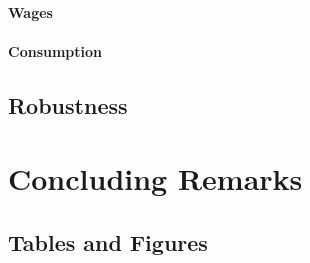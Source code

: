 \documentclass[10pt]{article}
\theoremstyle{definition}
\theoremstyle{remark}
\begin{document}
\paragraph{Wages} 

\paragraph{Consumption} 

\subsection{Robustness}\label{subsec:robust}


\section{Concluding Remarks}\label{sec:conc}


\newpage


\newpage
\begin{appendices}

\section{Tables and Figures}


\end{appendices}
\end{document}
